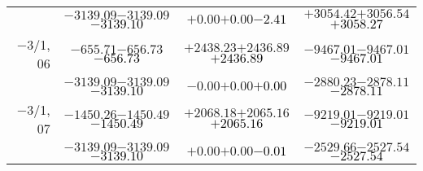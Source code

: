 \documentclass[compress]{beamer}
\begin{document}
\begin{frame}
{\begin{tabular}{r | c | c | c}
           & $-3139.09$\hspace{0.1 cm}$-3139.09$\hspace{0.1 cm}\textcolor{black}{$-3139.10$} & $+0.00$\hspace{0.1 cm}$+0.00$\hspace{0.1 cm}\textcolor{black}{$-2.41$} & $+3054.42$\hspace{0.1 cm}$+3056.54$\hspace{0.1 cm}\textcolor{black}{$+3058.27$} \\
$-$3/1, 06 & $-655.71$\hspace{0.1 cm}$-656.73$\hspace{0.1 cm}\textcolor{black}{$-656.73$} & $+2438.23$\hspace{0.1 cm}$+2436.89$\hspace{0.1 cm}\textcolor{black}{$+2436.89$} & $-9467.01$\hspace{0.1 cm}$-9467.01$\hspace{0.1 cm}\textcolor{black}{$-9467.01$} \\
           & $-3139.09$\hspace{0.1 cm}$-3139.09$\hspace{0.1 cm}\textcolor{black}{$-3139.10$} & $-0.00$\hspace{0.1 cm}$+0.00$\hspace{0.1 cm}\textcolor{black}{$+0.00$} & $-2880.23$\hspace{0.1 cm}$-2878.11$\hspace{0.1 cm}\textcolor{black}{$-2878.11$} \\
$-$3/1, 07 & $-1450.26$\hspace{0.1 cm}$-1450.49$\hspace{0.1 cm}\textcolor{black}{$-1450.49$} & $+2068.18$\hspace{0.1 cm}$+2065.16$\hspace{0.1 cm}\textcolor{black}{$+2065.16$} & $-9219.01$\hspace{0.1 cm}$-9219.01$\hspace{0.1 cm}\textcolor{black}{$-9219.01$} \\
           & $-3139.09$\hspace{0.1 cm}$-3139.09$\hspace{0.1 cm}\textcolor{black}{$-3139.10$} & $+0.00$\hspace{0.1 cm}$+0.00$\hspace{0.1 cm}\textcolor{black}{$-0.01$} & $-2529.66$\hspace{0.1 cm}$-2527.54$\hspace{0.1 cm}\textcolor{black}{$-2527.54$} \\

\end{tabular}}
\end{frame}
\end{document}
